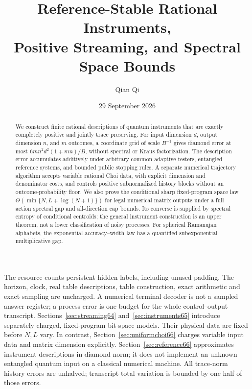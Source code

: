 \documentclass[11pt]{amsart}
\title[Reference-stable instruments and streaming]{Reference-Stable Rational Instruments,\\
Positive Streaming, and Spectral Space Bounds}
\author{Qian Qi}
\date{29 September 2026}
\numberwithin{equation}{section}
\theoremstyle{definition}\newtheorem{definition}[theorem]{Definition}
\theoremstyle{remark}\newtheorem{remark}[theorem]{Remark}
\begin{document}
\begin{abstract}
We construct finite rational descriptions of quantum instruments that
are exactly completely positive and jointly trace preserving.
For input dimension $d$, output dimension $n$, and $m$ outcomes, a
coordinate grid of scale $B^{-1}$ gives diamond error at most
$6mn^2d^2(1+mn)/B$, without spectral or Kraus factorization.
The description error accumulates additively under arbitrary common
adaptive testers, entangled reference systems, and bounded public
stopping rules. A separate numerical trajectory algorithm accepts
variable rational Choi data, with explicit dimension and denominator
costs, and controls positive subnormalized history blocks without an
outcome-probability floor. We also prove the conditional sharp fixed-program
space law $\Theta(\min\{N,L+\log(N+1)\})$ for legal numerical matrix
outputs under a full action spectral gap and all-direction cap bounds.
Its converse is supplied by spectral entropy of conditional centroids;
the general instrument construction is an upper theorem, not a lower
classification of noisy processes. For spherical Ramanujan alphabets, the exponential
accuracy--width law has a quantified subexponential multiplicative gap.
\end{abstract}
\maketitle
\noindent The resource counts persistent hidden labels, including unused
padding. The horizon, clock, real table descriptions, table construction,
exact arithmetic and exact sampling are uncharged. A numerical terminal
decoder is not a sampled answer register; a process error is one budget
for the whole control--output transcript. Sections~\ref{sec:streaming64} and~\ref{sec:instruments65}
introduce separately charged, fixed-program bit-space models.
Their physical data are fixed before $N,L$ vary. In contrast,
Section~\ref{sec:uniformchoi66} charges variable input data and matrix
dimension explicitly. Section~\ref{sec:reference66} approximates
instrument descriptions in diamond norm; it does not implement an
unknown entangled quantum input on a classical numerical machine.
All trace-norm history errors are unhalved; transcript total variation
is bounded by one half of those errors.


























\end{document}

